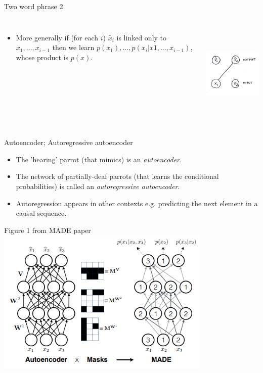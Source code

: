 \documentclass[usenames,dvipsnames]{beamer}
\begin{document}
\begin{frame}{Two word phrase 2}
	\begin{columns}
    \begin{itemize}
    \item{More generally if (for each $i$) $\tilde{x_i}$ is linked only to $x_1, \dots, x_{i-1}$ then we learn $p(x_1), \dots, p(x_i | x1, \dots, x_{i-1})$, whose product is $p(x)$.}
    \end{itemize}
             \centering
             \includegraphics[height=5cm]{image_03}
         \end{columns} 
\end{frame}

\begin{frame}{Autoencoder; Autoregressive autoencoder}
    \begin{itemize}
      \item{The 'hearing' parrot (that mimics) is an \textit{autoencoder}.}
	\item{The network of partially-deaf parrots (that learns the conditional probabilities) is called an \textit{autoregressive autoencoder}.}
	\item{Autoregression appears in other contexts e.g. predicting the next element in a causal sequence.}
    \end{itemize}
\end{frame}

\begin{frame}{Figure 1 from MADE paper}
     \centering
     \includegraphics[height=7cm]{image_04}
\end{frame}
\end{document}
